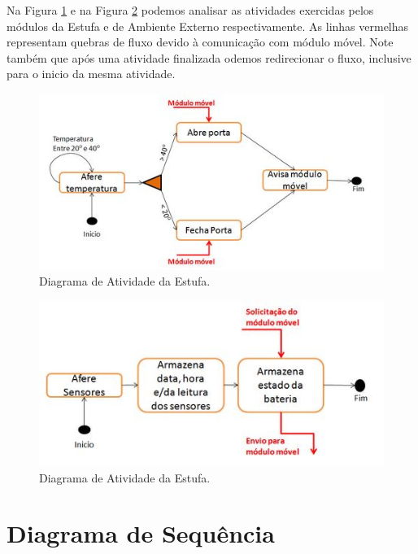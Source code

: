 \documentclass{report}
\begin{document}
    Na Figura \ref{figure:diagramaXAtividades} e na Figura \ref{figure:diagramaYAtividades} podemos analisar as atividades exercidas pelos módulos da Estufa e de Ambiente Externo respectivamente. 
    As linhas vermelhas representam quebras de fluxo devido à comunicação com módulo móvel. Note também que após uma atividade finalizada 
    odemos redirecionar o fluxo, inclusive para o inicio da mesma atividade.
    
      \begin{figure}[H]
	 \includegraphics[width=\linewidth]{pictures/diagramaXAtividades.JPG}
	 \caption{Diagrama de Atividade da Estufa.}
	 \label{figure:diagramaXAtividades}
	\end{figure}
	
      \begin{figure}[H]
	 \includegraphics[width=\linewidth]{pictures/diagramaYAtividades.JPG}
	 \caption{Diagrama de Atividade da Estufa.}
	 \label{figure:diagramaYAtividades}
	\end{figure}
	

   \section{Diagrama de Sequência}
   
\end{document}

